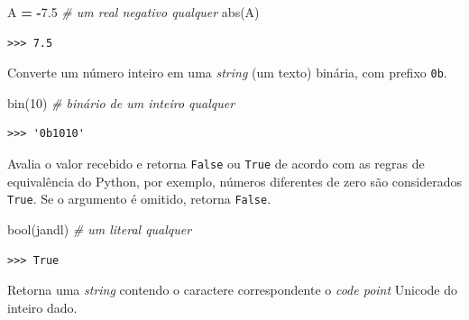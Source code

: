 \documentclass[
]{book}
\newenvironment{Shaded}{\begin{snugshade}}{\end{snugshade}}
\newcommand{\BuiltInTok}[1]{#1}
\newcommand{\CommentTok}[1]{\textcolor[rgb]{0.56,0.35,0.01}{\textit{#1}}}
\newcommand{\DecValTok}[1]{\textcolor[rgb]{0.00,0.00,0.81}{#1}}
\newcommand{\FloatTok}[1]{\textcolor[rgb]{0.00,0.00,0.81}{#1}}
\newcommand{\NormalTok}[1]{#1}
\newcommand{\OperatorTok}[1]{\textcolor[rgb]{0.81,0.36,0.00}{\textbf{#1}}}
\newcommand{\StringTok}[1]{\textcolor[rgb]{0.31,0.60,0.02}{#1}}
\providecommand{\tightlist}{%
  \setlength{\itemsep}{0pt}\setlength{\parskip}{0pt}}
\begin{document}
\begin{Shaded}
\begin{Highlighting}[]
\NormalTok{A }\OperatorTok{=} \OperatorTok{{-}}\FloatTok{7.5} \CommentTok{\# um real negativo qualquer}
\BuiltInTok{abs}\NormalTok{(A)}
\end{Highlighting}
\end{Shaded}

\begin{verbatim}
>>> 7.5
\end{verbatim}

\begin{description}
\tightlist
\item[\texttt{bin(x)}]
Converte um número inteiro em uma \emph{string} (um texto) binária, com prefixo \texttt{0b}.
\end{description}

\begin{Shaded}
\begin{Highlighting}[]
\BuiltInTok{bin}\NormalTok{(}\DecValTok{10}\NormalTok{) }\CommentTok{\# binário de um inteiro qualquer}
\end{Highlighting}
\end{Shaded}

\begin{verbatim}
>>> '0b1010'
\end{verbatim}

\begin{description}
\tightlist
\item[\texttt{bool(x)}]
Avalia o valor recebido e retorna \texttt{False} ou \texttt{True} de acordo com as regras de equivalência do Python, por exemplo, números diferentes de zero são considerados \texttt{True}. Se o argumento é omitido, retorna \texttt{False}.
\end{description}

\begin{Shaded}
\begin{Highlighting}[]
\BuiltInTok{bool}\NormalTok{(}\StringTok{\textquotesingle{}jandl\textquotesingle{}}\NormalTok{) }\CommentTok{\# um literal qualquer}
\end{Highlighting}
\end{Shaded}

\begin{verbatim}
>>> True
\end{verbatim}

\begin{description}
\tightlist
\item[\texttt{chr(x)}]
Retorna uma \emph{string} contendo o caractere correspondente o \emph{code point} Unicode do inteiro dado.
\end{description}
\end{document}

